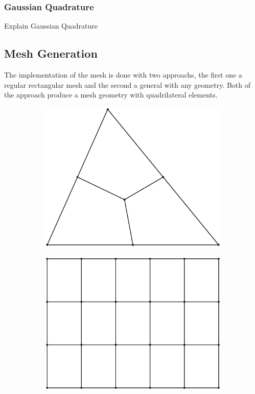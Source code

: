 \documentclass[10pt, a4paper]{article}
\begin{document}
\subsubsection{Gaussian Quadrature}

Explain Gaussian Quadrature




\subsection{Mesh Generation}

The implementation of the mesh is done with two approachs, the first one a regular rectangular mesh and the second a general with any geometry. Both of the approach produce a mesh geometry with quadrilateral elements.


\begin{figure}[H]
\centering
	\begin{subfigure}[H]{0.49\textwidth}
		\includegraphics[width=1.2\textwidth]{fig/mesh1.eps}
		\caption{}
		\label{fig:1}
	\end{subfigure}
	\begin{subfigure}[H]{0.49\textwidth}
		\includegraphics[width=\textwidth]{fig/mesh2.eps}

\end{subfigure}
\end{figure}
\end{document}
